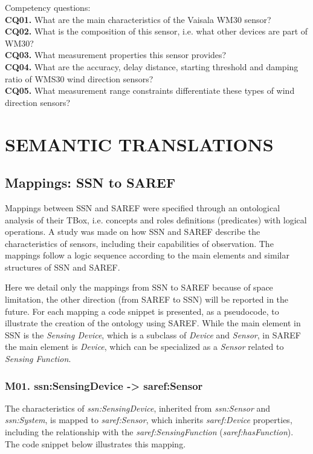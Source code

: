 \documentclass{sig-alternate-05-2015}
\begin{document}
Competency questions: 
\\\textbf{CQ01.} What are the main characteristics of the Vaisala WM30 sensor? 
\\\textbf{CQ02.} What is the composition of this sensor, i.e. what other devices are part of WM30?
\\\textbf{CQ03.} What measurement properties this sensor provides?
\\\textbf{CQ04.} What are the accuracy, delay distance, starting threshold and damping ratio of WMS30 wind direction sensors? 
\\\textbf{CQ05.} What measurement range constraints differentiate these types of wind direction sensors?

\section{SEMANTIC TRANSLATIONS}

\subsection{Mappings: SSN to SAREF}
Mappings between SSN and SAREF were specified through an ontological analysis of their TBox, i.e. concepts and roles definitions (predicates) with logical operations. A study was made on how SSN and SAREF describe the characteristics of sensors, including their capabilities of observation. The mappings follow a logic sequence according to the main elements and similar structures of SSN and SAREF. 

Here we detail only the mappings from SSN to SAREF because of space limitation, the other direction (from SAREF to SSN) will be reported in the future. For each mapping a code snippet is presented, as a pseudocode, to illustrate the creation of the ontology using SAREF. While the main element in SSN is the \textit{Sensing Device}, which is a subclass of \textit{Device} and \textit{Sensor}, in SAREF the main element is \textit{Device}, which can be specialized as a \textit{Sensor} related to \textit{Sensing Function}. 

\subsubsection{M01. ssn:\-SensingDevice -> saref:\-Sensor}
The characteristics of \textit{ssn:\-SensingDevice}, inherited from \textit{ssn:\-Sensor} and \textit{ssn:\-System}, is mapped to \textit{saref:\-Sensor}, which inherits \textit{saref:\-Device} properties, including the relationship with the \textit{saref:\-SensingFunction} (\textit{saref:\-hasFunction}). The code snippet below illustrates this mapping. 
\end{document}
